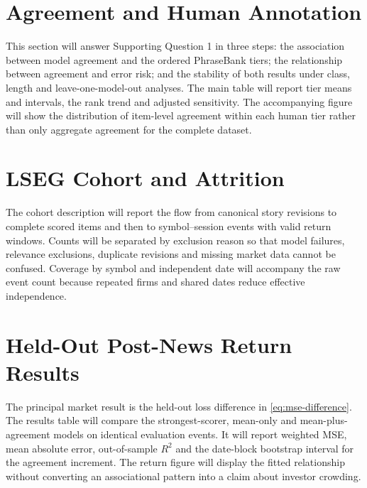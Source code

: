\documentclass[11pt,a4paper,oneside]{book}
\newif\ifshowdraftnotes
\newcommand{\draftnote}[1]{%
  \ifshowdraftnotes
    \par\smallskip
    \noindent{\color{draftgrey}\small\itshape Drafting note: #1\par}
    \smallskip
  \fi
}
\begin{document}
\section{Agreement and Human Annotation}
\label{sec:results-validity}

This section will answer Supporting Question 1 in three steps: the association between model agreement and the ordered PhraseBank tiers; the relationship between agreement and error risk; and the stability of both results under class, length and leave-one-model-out analyses.
The main table will report tier means and intervals, the rank trend and adjusted sensitivity.
The accompanying figure will show the distribution of item-level agreement within each human tier rather than only aggregate agreement for the complete dataset.

\draftnote{Insert the registered \texttt{phrasebank-agreement-core-v1} table, figure, effect estimates, intervals and direct supporting-question verdict. Do not infer reliability or confidence from agreement alone.}

\section{LSEG Cohort and Attrition}
\label{sec:results-cohort}

The cohort description will report the flow from canonical story revisions to complete scored items and then to symbol--session events with valid return windows.
Counts will be separated by exclusion reason so that model failures, relevance exclusions, duplicate revisions and missing market data cannot be confused.
Coverage by symbol and independent date will accompany the raw event count because repeated firms and shared dates reduce effective independence.

\draftnote{Insert the frozen cohort and attrition asset, confirm whether the market feasibility gate passed, and state any protocol deviation before presenting return results.}

\section{Held-Out Post-News Return Results}
\label{sec:results-market}

The principal market result is the held-out loss difference in \cref{eq:mse-difference}.
The results table will compare the strongest-scorer, mean-only and mean-plus-agreement models on identical evaluation events.
It will report weighted MSE, mean absolute error, out-of-sample $R^2$ and the date-block bootstrap interval for the agreement increment.
The return figure will display the fitted relationship without converting an associational pattern into a claim about investor crowding.
\end{document}
